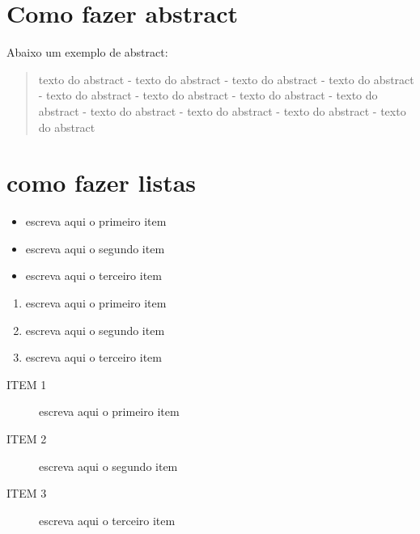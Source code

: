 \documentclass[12pt, a4paper]{article}
\begin{document}


\newpage
\tableofcontents
\thispagestyle{empty}
\newpage


\section{Como fazer abstract}

Abaixo um exemplo de abstract:

\begin{abstract}
texto do abstract - texto do abstract - texto do abstract - texto do abstract - texto do abstract - texto do abstract - texto do abstract - texto do abstract - texto do abstract - texto do abstract - texto do abstract - texto do abstract
\end{abstract}

\newpage
\section{como fazer listas}

\begin{itemize} %
\item escreva aqui o primeiro item \\
\item escreva aqui o segundo item \\
\item escreva aqui o terceiro item \\
\end{itemize}

\begin{enumerate}
\item escreva aqui o primeiro item \\
\item escreva aqui o segundo item \\
\item escreva aqui o terceiro item \\
\end{enumerate}

\begin{description}
\item[ITEM 1] escreva aqui o primeiro item \\
\item[ITEM 2]  escreva aqui o segundo item \\
\item[ITEM 3]  escreva aqui o terceiro item \\
\end{description}
\end{document}
